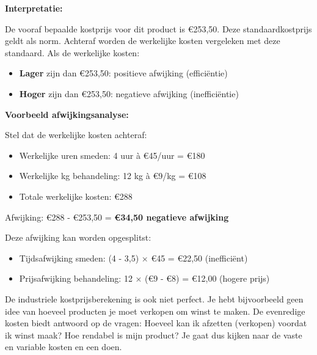 \documentclass[a4paper,11pt]{article}
\begin{document}
\begin{description}
\begin{oefenblok}[title=Oefening: Industriële Standaard Kostprijsberekening]
        \textbf{Interpretatie:}
        
        De vooraf bepaalde kostprijs voor dit product is €253,50. Deze standaardkostprijs geldt als norm. 
        Achteraf worden de werkelijke kosten vergeleken met deze standaard. Als de werkelijke kosten:
        \begin{itemize}
            \item \textbf{Lager} zijn dan €253,50: positieve afwijking (efficiëntie)
            \item \textbf{Hoger} zijn dan €253,50: negatieve afwijking (inefficiëntie)
        \end{itemize}
        
        \textbf{Voorbeeld afwijkingsanalyse:}
        
        Stel dat de werkelijke kosten achteraf:
        \begin{itemize}
            \item Werkelijke uren smeden: 4 uur à €45/uur = €180
            \item Werkelijke kg behandeling: 12 kg à €9/kg = €108
            \item Totale werkelijke kosten: €288
        \end{itemize}
        
        Afwijking: €288 - €253,50 = \textbf{€34,50 negatieve afwijking}
        
        Deze afwijking kan worden opgesplitst:
        \begin{itemize}
            \item Tijdsafwijking smeden: (4 - 3,5) × €45 = €22,50 (inefficiënt)
            \item Prijsafwijking behandeling: 12 × (€9 - €8) = €12,00 (hogere prijs)
        \end{itemize}
    \end{oefenblok}


    \item{} 
    De industriele kostprijsberekening is ook niet perfect.
    Je hebt bijvoorbeeld geen idee van hoeveel producten 
    je moet verkopen om winst te maken.
    De evenredige kosten biedt antwoord op de vragen:
    Hoeveel kan ik afzetten (verkopen) voordat ik winst maak?
    Hoe rendabel is mijn product?
    \newline
    Je gaat dus kijken naar de vaste en variable kosten
    en een  doen.




\end{description}
\end{document}
